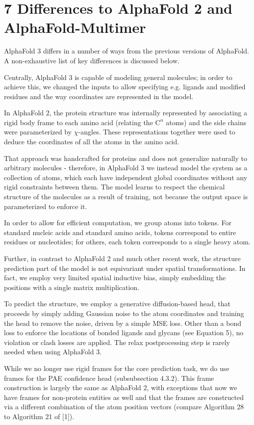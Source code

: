 \documentclass[10pt]{article}
\begin{document}
\section*{7 Differences to AlphaFold 2 and AlphaFold-Multimer}
AlphaFold 3 differs in a number of ways from the previous versions of AlphaFold. A non-exhaustive list of key differences is discussed below.

Centrally, AlphaFold 3 is capable of modeling general molecules; in order to achieve this, we changed the inputs to allow specifying e.g. ligands and modified residues and the way coordinates are represented in the model.

In AlphaFold 2, the protein structure was internally represented by associating a rigid body frame to each amino acid (relating the $\mathrm{C}^{\alpha}$ atoms) and the side chains were parameterized by $\chi$-angles. These representations together were used to deduce the coordinates of all the atoms in the amino acid.

That approach was handcrafted for proteins and does not generalize naturally to arbitrary molecules - therefore, in AlphaFold 3 we instead model the system as a collection of atoms, which each have independent global coordinates without any rigid constraints between them. The model learns to respect the chemical structure of the molecules as a result of training, not because the output space is parameterized to enforce it.

In order to allow for efficient computation, we group atoms into tokens. For standard nucleic acids and standard amino acids, tokens correspond to entire residues or nucleotides; for others, each token corresponds to a single heavy atom.

Further, in contrast to AlphaFold 2 and much other recent work, the structure prediction part of the model is not equivariant under spatial transformations. In fact, we employ very limited spatial inductive bias, simply embedding the positions with a single matrix multiplication.

To predict the structure, we employ a generative diffusion-based head, that proceeds by simply adding Gaussian noise to the atom coordinates and training the head to remove the noise, driven by a simple MSE loss. Other than a bond loss to enforce the locations of bonded ligands and glycans (see Equation 5), no violation or clash losses are applied. The relax postprocessing step is rarely needed when using AlphaFold 3.

While we no longer use rigid frames for the core prediction task, we do use frames for the PAE confidence head (subsubsection 4.3.2). This frame construction is largely the same as AlphaFold 2, with exceptions that now we have frames for non-protein entities as well and that the frames are constructed via a different combination of the atom position vectors (compare Algorithm 28 to Algorithm 21 of [1]).
\end{document}
